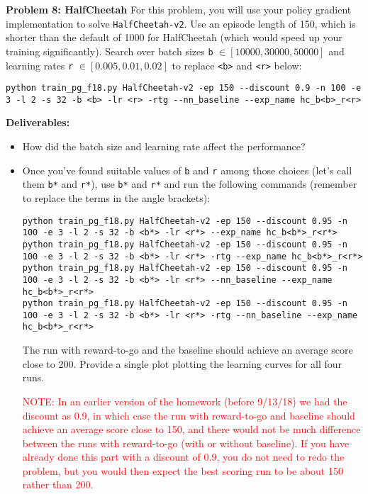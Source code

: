 \documentclass[12pt]{article}
\begin{document}
\textbf{Problem 8: HalfCheetah} For this problem, you will use your policy gradient implementation to solve \verb|HalfCheetah-v2|. 
Use an episode length of 150, which is shorter than the default of 1000 for HalfCheetah (which would speed up your training significantly).
Search over batch sizes \texttt{b} $\in [10000,30000,50000]$ and learning rates \texttt{r} $\in [0.005, 0.01, 0.02]$ to replace \texttt{<b>} and \texttt{<r>} below:
\begin{lstlisting}
python train_pg_f18.py HalfCheetah-v2 -ep 150 --discount 0.9 -n 100 -e 3 -l 2 -s 32 -b <b> -lr <r> -rtg --nn_baseline --exp_name hc_b<b>_r<r>
\end{lstlisting}
\textbf{Deliverables:}
\begin{itemize}
    \item How did the batch size and learning rate affect the performance?
    \item Once you've found suitable values of \texttt{b} and \texttt{r} among those choices (let's call them \texttt{b*} and \texttt{r*}), use \texttt{b*} and \texttt{r*}
and run the following commands (remember to replace the terms in the angle brackets):
\begin{lstlisting}
python train_pg_f18.py HalfCheetah-v2 -ep 150 --discount 0.95 -n 100 -e 3 -l 2 -s 32 -b <b*> -lr <r*> --exp_name hc_b<b*>_r<r*>
python train_pg_f18.py HalfCheetah-v2 -ep 150 --discount 0.95 -n 100 -e 3 -l 2 -s 32 -b <b*> -lr <r*> -rtg --exp_name hc_b<b*>_r<r*>
python train_pg_f18.py HalfCheetah-v2 -ep 150 --discount 0.95 -n 100 -e 3 -l 2 -s 32 -b <b*> -lr <r*> --nn_baseline --exp_name hc_b<b*>_r<r*>
python train_pg_f18.py HalfCheetah-v2 -ep 150 --discount 0.95 -n 100 -e 3 -l 2 -s 32 -b <b*> -lr <r*> -rtg --nn_baseline --exp_name hc_b<b*>_r<r*>
\end{lstlisting}
The run with reward-to-go and the baseline should achieve an average score close to 200. Provide a single plot plotting the learning curves for all four runs.

\textcolor{red}{NOTE: In an earlier version of the homework (before 9/13/18) we had the discount as 0.9, in which case the run with reward-to-go and baseline should achieve an average score close to 150, and there would not be much difference between the runs with reward-to-go (with or without baseline). If you have already done this part with a discount of 0.9, you do not need to redo the problem, but you would then expect the best scoring run to be about 150 rather than 200.}
\end{itemize}
\end{document}
